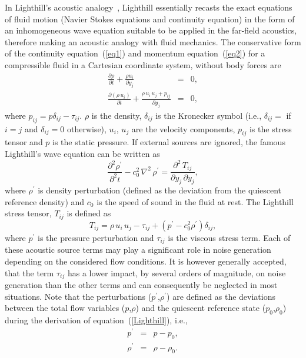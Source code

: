 \documentclass[10pt]{article}
\theoremstyle{plain}
\theoremstyle{definition}
\theoremstyle{remark}
\begin{document}
In Lighthill's acoustic analogy~\cite{Lighthill1952}, Lighthill essentially recasts the exact equations of fluid motion (Navier Stokes equations and continuity equation) in the form of an inhomogeneous wave equation suitable to be applied in the far-field acoustics, therefore making an acoustic analogy with fluid mechanics.
The conservative form of the continuity equation~(\ref{eq1}) and momentum equation~(\ref{eq2}) for a compressible fluid in a Cartesian coordinate system, without body forces are
%
\begin{eqnarray}
\frac{\partial \rho}{\partial t} + \frac{\rho u_i}{\partial y_j} & = & 0 ,\label{eq1} \\
\frac{\partial (\rho \, u_i)}{\partial t} + \frac{\rho \, u_i \, u_j + p_{ij}}{\partial y_j} & = & 0 , \label{eq2}
\end{eqnarray}
%
where $p_{ij} = p\delta_{ij} - \tau_{ij}$. $\rho$ is the density, $\delta_{ij}$ is the Kronecker symbol (i.e., $\delta_{ij} = $ if $i = j$ and $\delta_{ij} = 0$ otherwise), $u_i$, $u_j$ are the velocity components, $p_{ij}$ is the stress tensor and $p$ is the static pressure.
If external sources are ignored, the famous Lighthill's wave equation can be written as 
%
\begin{equation}
\frac{\partial^{2} \rho^{'}}{\partial^{2} t} - c_0^{2} \, \nabla^{2} \, \rho^{'} = \frac{\partial^{2} \, T_{ij} }{\partial y_j \, \partial y_j}, \label{Lighthill}
\end{equation}
%
where $\rho^{'}$ is density perturbation (defined as the deviation from the quiescent reference density) and $c_0$ is the speed of sound in the fluid at rest.
The Lighthill stress tensor, $T_{ij}$ is defined as
%
\begin{equation}
T_{ij} = \rho \, u_i \, u_j - \tau_{ij} + (p^{'} - c_0^{2}\rho^{'})\delta_{ij}, \label{Tensorlight}
\end{equation}
%
where $p^{'}$ is the pressure perturbation and $\tau_{ij}$ is the viscous stress term.
Each of these acoustic source terms may play a significant role in noise generation depending on the considered flow conditions.
It is however generally accepted, that the term $\tau_{ij}$ has a lower impact, by several orders of magnitude, on noise generation than the other terms and can consequently be neglected in most situations.
Note that the perturbations ($p^{'}$,$\rho^{'}$) are defined as the deviations between the total flow variables ($p$,$\rho$) and the quiescent reference state ($p_0$,$\rho_0$) during the derivation of equation~(\ref{Lighthill}), i.e.,
%
\begin{eqnarray}
p^{'} & = & p - p_0, \\
\rho^{'} & = & \rho - \rho_0.
\end{eqnarray}
\end{document}
